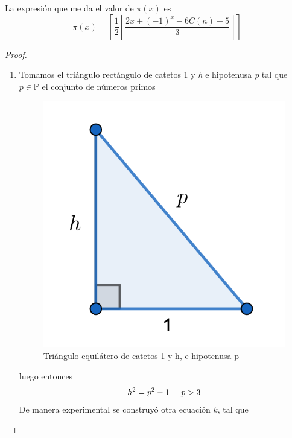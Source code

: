 \documentclass[10pt,letterpaper]{article}
\begin{document}
 \begin{teoremaf2}
 	La expresión que me da el valor de $\pi(x)$ es 
 	\begin{equation}
 		\pi(x)   = \left\lceil \frac{1}{2}\left\lfloor \frac{2x + (-1)^x - 6C(n) + 5}{3}\right\rfloor\right\rceil
 	\end{equation}
 \end{teoremaf2}	  
	\begin{proof}
		\begin{enumerate}
			\item Tomamos el triángulo rectángulo de catetos 1 y \textit{h} e hipotenusa \textit{p} tal que $p \in \mathbb{P}$ el conjunto de números primos
			\begin{figure}[th!]
				\centering
				\includegraphics[scale = .7]{Imagenes/ContadorNumerosPrimos}
				\caption{Triángulo equilátero de catetos 1 y h, e hipotenusa p}
				\label{fig:contadornumerosprimos}
			\end{figure}
		luego entonces 
		\begin{equation}
			h^2 = p^2 - 1 \hspace{5mm} p > 3
		\end{equation}
			De manera experimental se construyó otra  ecuación  $k$, tal que
			\begin{equation*}

\end{equation*}
\end{enumerate}
\end{proof}
\end{document}
